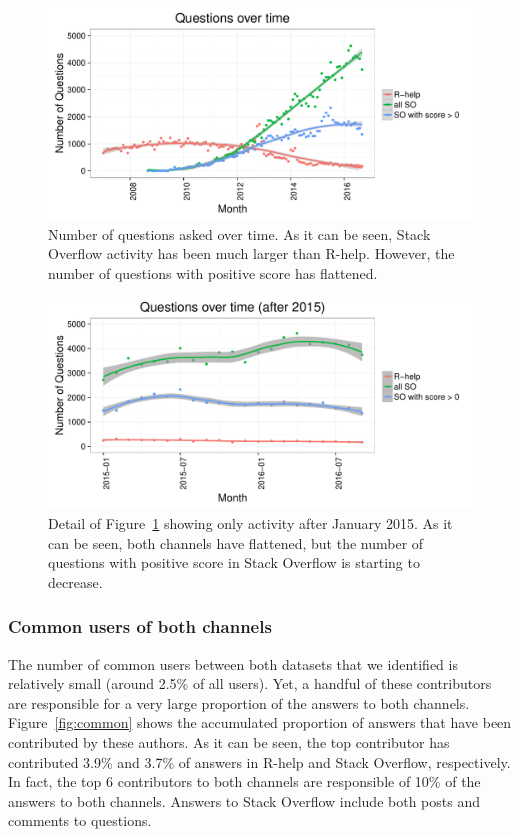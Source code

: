 \documentclass[smallextended]{svjour3}       %
\newcommand{\SO}{Stack Overflow\xspace}
\newcommand{\RH}{R-help\xspace}
\begin{document}
\begin{figure}[htbp]
  \centering
  \includegraphics[width=.95\textwidth]{figs/actByMonth.pdf}
  \caption{Number of questions asked over time. As it can be seen, \SO activity has been much larger than \RH. However,
    the number of questions with positive score has flattened.}
  \label{fig:channelsActPerMonth}
\end{figure}


\begin{figure}[htbp]
  \centering
  \includegraphics[width=.95\textwidth]{figs/actByMonth2016.pdf}
  \caption{Detail of Figure~\ref{fig:channelsActPerMonth} showing only activity after January 2015. As it can be seen, both
    channels have flattened, but the number of questions with positive score in \SO is starting to decrease.}
  \label{fig:channelsActPerMonthLatests}
\end{figure}

\subsubsection{Common users of both channels}

The number of common users between both datasets that we identified is relatively small (around 2.5\% of all
users). Yet, a handful of these contributors are responsible for a very large proportion of the answers to both
channels. Figure~\ref{fig:common} shows the accumulated proportion of answers that have been contributed by these
authors. As it can be seen, the top contributor has contributed 3.9\% and 3.7\% of answers in \RH and \SO,
respectively. In fact, the top 6 contributors to both channels are responsible of 10\% of the answers to both
channels. Answers to \SO include both posts and comments to questions.
\end{document}
